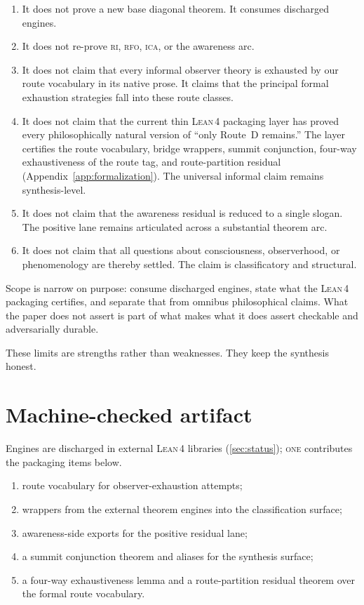\documentclass[11pt]{article}
\theoremstyle{plain}
\theoremstyle{definition}
\theoremstyle{remark}
\newcommand{\ONE}{\textsc{one}}
\newcommand{\RI}{\textsc{ri}}
\newcommand{\RFO}{\textsc{rfo}}
\newcommand{\ICA}{\textsc{ica}}
\newcommand{\Lean}{\textsc{Lean\,4}}
\begin{document}
\begin{enumerate}[label=(\arabic*),leftmargin=2.2em]
\item It does not prove a new base diagonal theorem.  It consumes
      discharged engines.
\item It does not re-prove \RI, \RFO, \ICA, or the awareness arc.
\item It does not claim that every informal observer theory is exhausted
      by our route vocabulary in its native prose.  It claims that the
      principal formal exhaustion strategies fall into these route
      classes.
\item It does not claim that the current thin \Lean{} packaging layer has
      proved every philosophically natural version of ``only Route~D
      remains.''  The layer certifies the route vocabulary, bridge
      wrappers, summit conjunction, four-way exhaustiveness of the route
      tag, and route-partition residual (Appendix~\ref{app:formalization}).  The
      universal informal claim remains synthesis-level.
\item It does not claim that the awareness residual is reduced to a
      single slogan.  The positive lane remains articulated across a
      substantial theorem arc.
\item It does not claim that all questions about consciousness,
      observerhood, or phenomenology are thereby settled.  The claim is
      classificatory and structural.
\end{enumerate}

\begin{keybox}[title={Honest limits as methodological strength}]
Scope is narrow on purpose: consume discharged engines, state what the
\Lean{} packaging certifies, and separate that from omnibus philosophical
claims.  What the paper does not assert is part of what makes what it
does assert checkable and adversarially durable.
\end{keybox}

These limits are strengths rather than weaknesses.  They keep the
synthesis honest.

\section{Machine-checked artifact}
\label{sec:artifact}

Engines are discharged in external \Lean{} libraries (\cref{sec:status});
\ONE{} contributes the packaging items below.
\begin{enumerate}[label=(\arabic*),leftmargin=2.2em]
\item route vocabulary for observer-exhaustion attempts;
\item wrappers from the external theorem engines into the classification
      surface;
\item awareness-side exports for the positive residual lane;
\item a summit conjunction theorem and aliases for the synthesis surface;
\item a four-way exhaustiveness lemma and a route-partition residual
      theorem over the formal route vocabulary.
\end{enumerate}
\end{document}
